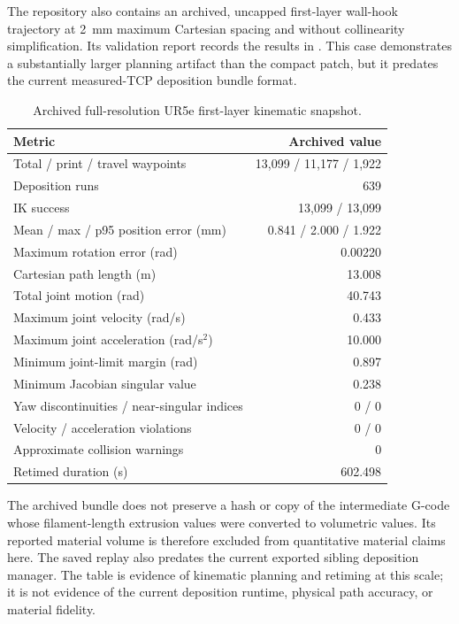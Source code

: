 \documentclass[letterpaper,10pt,conference]{ieeeconf}
\begin{document}
The repository also contains an archived, uncapped first-layer wall-hook
trajectory at \SI{2}{\milli\meter} maximum Cartesian spacing and without
collinearity simplification.  Its validation report records the results in
.  This case demonstrates a substantially larger planning
artifact than the compact patch, but it predates the current measured-TCP
deposition bundle format.

\begin{table}[!t]
\centering
\caption{Archived full-resolution UR5e first-layer kinematic snapshot.}
\label{tab:ur5e-large}
\footnotesize
\begin{tabularx}{\linewidth}{@{}Xr@{}}
\toprule
Metric & Archived value \\
\midrule
Total / print / travel waypoints & 13,099 / 11,177 / 1,922 \\
Deposition runs & 639 \\
IK success & 13,099 / 13,099 \\
Mean / max / p95 position error (mm) & 0.841 / 2.000 / 1.922 \\
Maximum rotation error (rad) & 0.00220 \\
Cartesian path length (m) & 13.008 \\
Total joint motion (rad) & 40.743 \\
Maximum joint velocity (rad/s) & 0.433 \\
Maximum joint acceleration (rad/s$^2$) & 10.000 \\
Minimum joint-limit margin (rad) & 0.897 \\
Minimum Jacobian singular value & 0.238 \\
Yaw discontinuities / near-singular indices & 0 / 0 \\
Velocity / acceleration violations & 0 / 0 \\
Approximate collision warnings & 0 \\
Retimed duration (s) & 602.498 \\
\bottomrule
\end{tabularx}
\end{table}

The archived bundle does not preserve a hash or copy of the intermediate G-code
whose filament-length extrusion values were converted to volumetric values.
Its reported material volume is therefore excluded from quantitative material
claims here.  The saved replay also predates the current exported sibling
deposition manager.  The table is evidence of kinematic planning and retiming
at this scale; it is not evidence of the current deposition runtime, physical
path accuracy, or material fidelity.
\end{document}
